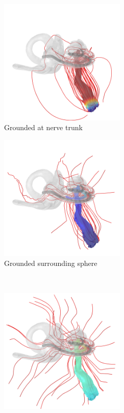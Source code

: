 \begin{figure}
    \centering
    
    \begin{subfigure}[t]{0.4\textwidth}
        \centering
        \includegraphics[width=6cm,trim={0 0 0 8mm},clip]
        {Simulations/BCs/Streamlines_nrv}
        \caption{Grounded at nerve trunk}
        \label{fig:bc_streams_nrv}
    \end{subfigure}%
    \begin{subfigure}[t]{0.4\textwidth}
        \centering
        \includegraphics[width=6cm,trim={0 0 0 8mm},clip]
        {Simulations/BCs/Streamlines_sph}
        \caption{Grounded surrounding sphere}
        \label{fig:bc_streams_sph}
    \end{subfigure}\\%
    \vspace{1em}%
    \begin{subfigure}[t]{0.1\textwidth}
    	\phantom{\hspace{1.55cm}}
    \end{subfigure}%
    \begin{subfigure}[t]{0.4\textwidth}
        \centering
        \includegraphics[width=6cm]{Simulations/BCs/Streamlines_MP1}

\end{subfigure}
\end{figure}
